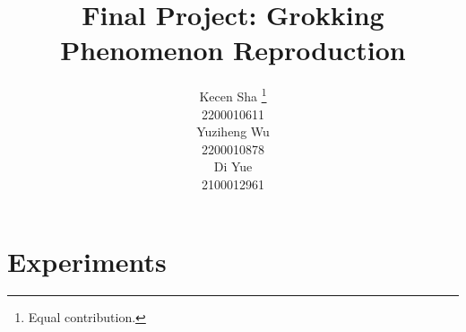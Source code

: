 \documentclass{article}
\title{Final Project: Grokking Phenomenon Reproduction}
\author{%
  Kecen Sha \thanks{Equal contribution.} \\
  2200010611\\
  \And
  Yuziheng Wu \footnotemark[1]\\
  2200010878 \\
  \And
  Di Yue \footnotemark[1]\\
  2100012961 \\
}
\theoremstyle{definition}
\begin{document}
\maketitle







\section{Experiments}









\begin{small}	
    
\end{small}








\end{document}
